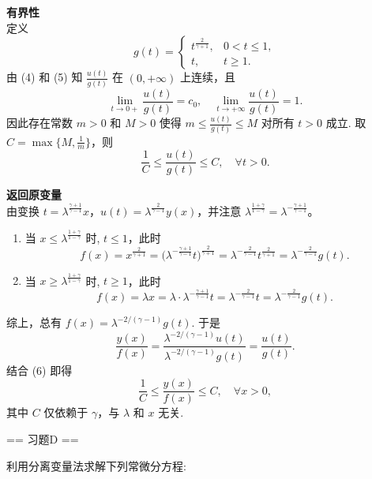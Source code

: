 \begin{enumerate}
\begin{solution}
        \textbf{有界性}\\
        定义
        \[
        g(t) = \begin{cases}
        t^{\frac{2}{\gamma+1}}, & 0<t\le 1,\\
        t, & t\ge 1.
        \end{cases}
        \]
        由 (4) 和 (5) 知 $\frac{u(t)}{g(t)}$ 在 $(0,+\infty)$ 上连续，且
        \[
        \lim_{t\to 0+}\frac{u(t)}{g(t)} = c_0,\quad \lim_{t\to+\infty}\frac{u(t)}{g(t)} = 1.
        \]
        因此存在常数 $m>0$ 和 $M>0$ 使得 $\displaystyle m \le \frac{u(t)}{g(t)} \le M$ 对所有 $t>0$ 成立.
        取 $\displaystyle C = \max\{M,\frac{1}{m}\}$，则
        \[
        \frac{1}{C} \le \frac{u(t)}{g(t)} \le C,\quad \forall t>0. \tag{6}
        \]

        \textbf{返回原变量}\\
        由变换 $\displaystyle t = \lambda^{\frac{\gamma+1}{\gamma-1}}x$，$\displaystyle u(t) = \lambda^{\frac{2}{\gamma-1}}y(x)$，并注意 $\displaystyle \lambda^{\frac{1+\gamma}{1-\gamma}} = \lambda^{-\frac{\gamma+1}{\gamma-1}}$。
        \begin{enumerate}
        \item[i.] 当 $x \le \lambda^{\frac{1+\gamma}{1-\gamma}}$ 时, $t\le1$，此时
        \[
        f(x) = x^{\frac{2}{\gamma+1}} = \bigl(\lambda^{-\frac{\gamma+1}{\gamma-1}}t\bigr)^{\frac{2}{\gamma+1}} = \lambda^{-\frac{2}{\gamma-1}}t^{\frac{2}{\gamma+1}} = \lambda^{-\frac{2}{\gamma-1}}g(t).
        \]
        \item[ii.] 当 $x \ge \lambda^{\frac{1+\gamma}{1-\gamma}}$ 时, $t\ge1$，此时
        \[
        f(x) = \lambda x = \lambda\cdot\lambda^{-\frac{\gamma+1}{\gamma-1}}t = \lambda^{-\frac{2}{\gamma-1}}t = \lambda^{-\frac{2}{\gamma-1}}g(t).
        \]
        \end{enumerate}
        综上，总有 $f(x) = \lambda^{-2/(\gamma-1)} g(t)$.
        于是
        \[
        \frac{y(x)}{f(x)} = \frac{\lambda^{-2/(\gamma-1)}u(t)}{\lambda^{-2/(\gamma-1)}g(t)} = \frac{u(t)}{g(t)}.
        \]
        结合 (6) 即得
        \[
        \frac{1}{C} \le \frac{y(x)}{f(x)} \le C,\quad \forall x>0,
        \]
        其中 $C$ 仅依赖于 $\gamma$，与 $\lambda$ 和 $x$ 无关.
    \end{solution}
\end{enumerate}

== 习题D ==

利用分离变量法求解下列常微分方程:

